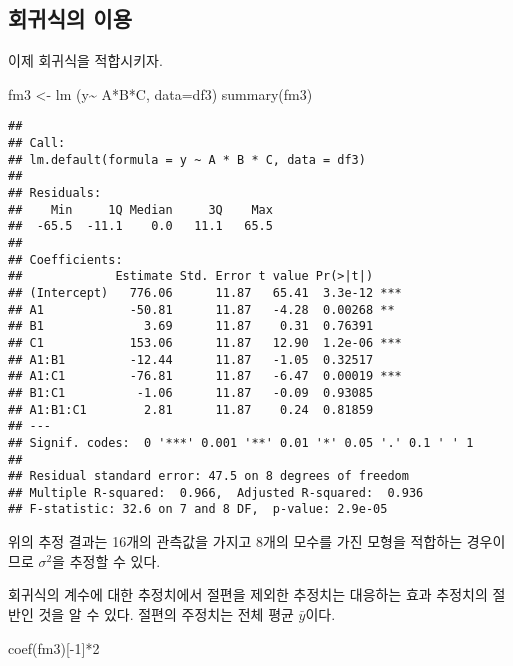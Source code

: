 \documentclass[
]{book}
\newenvironment{Shaded}{\begin{snugshade}}{\end{snugshade}}
\newcommand{\AttributeTok}[1]{\textcolor[rgb]{0.77,0.63,0.00}{#1}}
\newcommand{\DecValTok}[1]{\textcolor[rgb]{0.00,0.00,0.81}{#1}}
\newcommand{\FunctionTok}[1]{\textcolor[rgb]{0.00,0.00,0.00}{#1}}
\newcommand{\NormalTok}[1]{#1}
\newcommand{\OtherTok}[1]{\textcolor[rgb]{0.56,0.35,0.01}{#1}}
\newcommand{\SpecialCharTok}[1]{\textcolor[rgb]{0.00,0.00,0.00}{#1}}
\begin{document}
\hypertarget{uxd68cuxadc0uxc2dduxc758-uxc774uxc6a9-1}{%
\subsection{회귀식의 이용}\label{uxd68cuxadc0uxc2dduxc758-uxc774uxc6a9-1}}

이제 회귀식을 적합시키자.

\begin{Shaded}
\begin{Highlighting}[]
\NormalTok{fm3 }\OtherTok{\textless{}{-}} \FunctionTok{lm}\NormalTok{ (y}\SpecialCharTok{\textasciitilde{}}\NormalTok{ A}\SpecialCharTok{*}\NormalTok{B}\SpecialCharTok{*}\NormalTok{C, }\AttributeTok{data=}\NormalTok{df3) }
\FunctionTok{summary}\NormalTok{(fm3)}
\end{Highlighting}
\end{Shaded}

\begin{verbatim}
## 
## Call:
## lm.default(formula = y ~ A * B * C, data = df3)
## 
## Residuals:
##    Min     1Q Median     3Q    Max 
##  -65.5  -11.1    0.0   11.1   65.5 
## 
## Coefficients:
##             Estimate Std. Error t value Pr(>|t|)    
## (Intercept)   776.06      11.87   65.41  3.3e-12 ***
## A1            -50.81      11.87   -4.28  0.00268 ** 
## B1              3.69      11.87    0.31  0.76391    
## C1            153.06      11.87   12.90  1.2e-06 ***
## A1:B1         -12.44      11.87   -1.05  0.32517    
## A1:C1         -76.81      11.87   -6.47  0.00019 ***
## B1:C1          -1.06      11.87   -0.09  0.93085    
## A1:B1:C1        2.81      11.87    0.24  0.81859    
## ---
## Signif. codes:  0 '***' 0.001 '**' 0.01 '*' 0.05 '.' 0.1 ' ' 1
## 
## Residual standard error: 47.5 on 8 degrees of freedom
## Multiple R-squared:  0.966,  Adjusted R-squared:  0.936 
## F-statistic: 32.6 on 7 and 8 DF,  p-value: 2.9e-05
\end{verbatim}

위의 추정 결과는 16개의 관측값을 가지고 8개의 모수를 가진 모형을 적합하는 경우이므로 \(\sigma^2\)을 추정할 수 있다.

회귀식의 계수에 대한 추정치에서 절편을 제외한 추정치는 대응하는 효과 추정치의 절반인 것을 알 수 있다.
절편의 주정치는 전체 평균 \(\bar y\)이다.

\begin{Shaded}
\begin{Highlighting}[]
\FunctionTok{coef}\NormalTok{(fm3)[}\SpecialCharTok{{-}}\DecValTok{1}\NormalTok{]}\SpecialCharTok{*}\DecValTok{2}
\end{Highlighting}
\end{Shaded}
\end{document}

